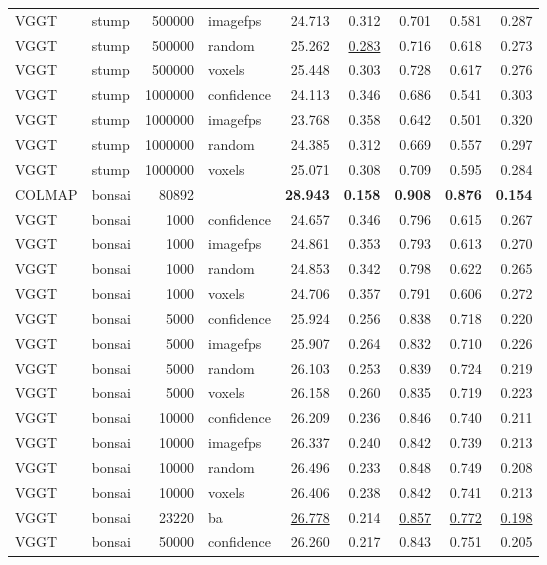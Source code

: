 \begin{table}[H]
\begin{tabular}{llrlrrrrr}
VGGT & stump & 500000 & imagefps & 24.713 & 0.312 & 0.701 & 0.581 & 0.287 \\
VGGT & stump & 500000 & random & 25.262 & \underline{0.283} & 0.716 & 0.618 & 0.273 \\
VGGT & stump & 500000 & voxels & 25.448 & 0.303 & 0.728 & 0.617 & 0.276 \\
VGGT & stump & 1000000 & confidence & 24.113 & 0.346 & 0.686 & 0.541 & 0.303 \\
VGGT & stump & 1000000 & imagefps & 23.768 & 0.358 & 0.642 & 0.501 & 0.320 \\
VGGT & stump & 1000000 & random & 24.385 & 0.312 & 0.669 & 0.557 & 0.297 \\
VGGT & stump & 1000000 & voxels & 25.071 & 0.308 & 0.709 & 0.595 & 0.284 \\
\midrule
COLMAP & bonsai & 80892 &  & \textbf{28.943} & \textbf{0.158} & \textbf{0.908} & \textbf{0.876} & \textbf{0.154} \\
VGGT & bonsai & 1000 & confidence & 24.657 & 0.346 & 0.796 & 0.615 & 0.267 \\
VGGT & bonsai & 1000 & imagefps & 24.861 & 0.353 & 0.793 & 0.613 & 0.270 \\
VGGT & bonsai & 1000 & random & 24.853 & 0.342 & 0.798 & 0.622 & 0.265 \\
VGGT & bonsai & 1000 & voxels & 24.706 & 0.357 & 0.791 & 0.606 & 0.272 \\
VGGT & bonsai & 5000 & confidence & 25.924 & 0.256 & 0.838 & 0.718 & 0.220 \\
VGGT & bonsai & 5000 & imagefps & 25.907 & 0.264 & 0.832 & 0.710 & 0.226 \\
VGGT & bonsai & 5000 & random & 26.103 & 0.253 & 0.839 & 0.724 & 0.219 \\
VGGT & bonsai & 5000 & voxels & 26.158 & 0.260 & 0.835 & 0.719 & 0.223 \\
VGGT & bonsai & 10000 & confidence & 26.209 & 0.236 & 0.846 & 0.740 & 0.211 \\
VGGT & bonsai & 10000 & imagefps & 26.337 & 0.240 & 0.842 & 0.739 & 0.213 \\
VGGT & bonsai & 10000 & random & 26.496 & 0.233 & 0.848 & 0.749 & 0.208 \\
VGGT & bonsai & 10000 & voxels & 26.406 & 0.238 & 0.842 & 0.741 & 0.213 \\
VGGT & bonsai & 23220 & ba & \underline{26.778} & 0.214 & \underline{0.857} & \underline{0.772} & \underline{0.198} \\
VGGT & bonsai & 50000 & confidence & 26.260 & 0.217 & 0.843 & 0.751 & 0.205 \\

\end{tabular}
\end{table}
